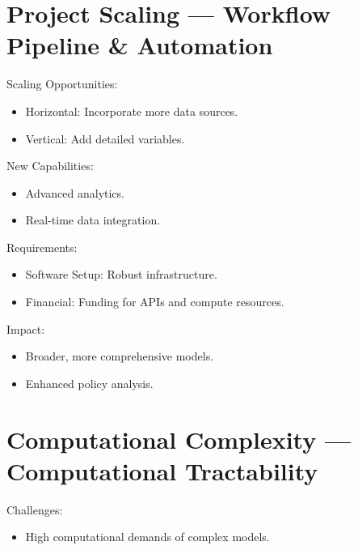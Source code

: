 \documentclass[
  letterpaper,
]{book}
\providecommand{\tightlist}{%
  \setlength{\itemsep}{0pt}\setlength{\parskip}{0pt}}
\begin{document}
\section{Project Scaling --- Workflow Pipeline \&
Automation}\label{project-scaling-workflow-pipeline-automation}

Scaling Opportunities:

\begin{itemize}
\tightlist
\item
  Horizontal: Incorporate more data sources.\\
\item
  Vertical: Add detailed variables.
\end{itemize}

New Capabilities:

\begin{itemize}
\tightlist
\item
  Advanced analytics.\\
\item
  Real-time data integration.
\end{itemize}

Requirements:

\begin{itemize}
\tightlist
\item
  Software Setup: Robust infrastructure.\\
\item
  Financial: Funding for APIs and compute resources.
\end{itemize}

Impact:

\begin{itemize}
\tightlist
\item
  Broader, more comprehensive models.\\
\item
  Enhanced policy analysis.
\end{itemize}

\section{Computational Complexity --- Computational
Tractability}\label{computational-complexity-computational-tractability}

Challenges:

\begin{itemize}
\tightlist
\item
  High computational demands of complex models.
\end{itemize}
\end{document}
